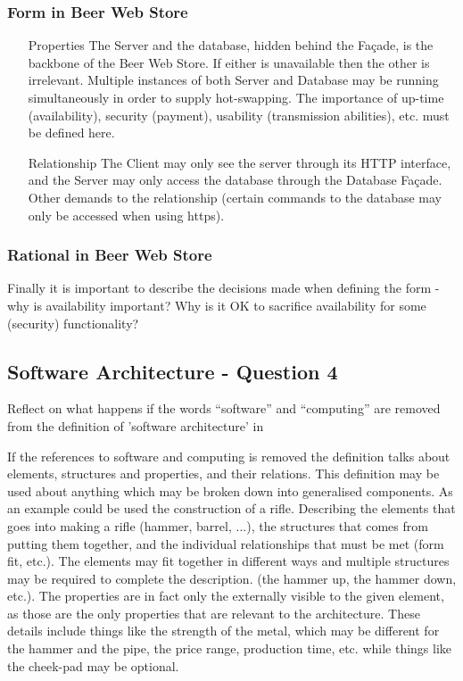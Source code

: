 \subsubsection{Form in Beer Web Store}
\begin{itemize}
    \item[Properties] The Server and the database, hidden behind the Fa\c cade, is the backbone of the Beer Web Store. If either is unavailable then the other is irrelevant. Multiple instances of both Server and Database may be running simultaneously in order to supply hot-swapping. The importance of up-time (availability), security (payment), usability (transmission abilities), etc. must be defined here.
    \item[Relationship] The Client may only see the server through its
 HTTP interface, and the Server may only access the database through the Database Fa\c cade. Other demands to the relationship (certain commands to the database may only be accessed when using https).
\end{itemize}

\subsubsection{Rational in Beer Web Store}

Finally it is important to describe the decisions made when defining the form - why is availability important? Why is it OK to sacrifice availability for some (security) functionality?

\subsection{Software Architecture - Question 4}

\begin{question}
Reflect on what happens if the words ``software'' and
``computing'' are removed from the definition of 'software
architecture' in \cite{bass2003sa}
\end{question}

If the references to software and computing is removed the definition talks about elements, structures and properties, and their relations. This definition may be used about anything which may be broken down into generalised components. As an example could be used the construction of a rifle. Describing the elements that goes into making a rifle (hammer, barrel, ...), the structures that comes from putting them together, and the individual relationships that must be met (form fit, etc.). The elements may fit together in different ways and multiple structures may be required to complete the description. (the hammer up, the hammer down, etc.). The properties are in fact only the externally visible to the given element, as those are the only properties that are relevant to the architecture. These details include things like the strength of the metal, which may be different for the hammer and the pipe, the price range, production time, etc. while things like the cheek-pad may be optional.

